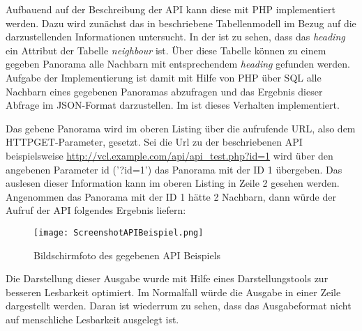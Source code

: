 
Aufbauend auf der Beschreibung der API kann diese mit PHP implementiert werden. Dazu wird zunächst das in  beschriebene Tabellenmodell im Bezug auf die darzustellenden Informationen untersucht. In der  ist zu sehen, dass das \textit{heading} ein Attribut der Tabelle \textit{neighbour} ist. Über diese Tabelle können zu einem gegeben Panorama alle Nachbarn mit entsprechendem \textit{heading} gefunden werden. Aufgabe der Implementierung ist damit mit Hilfe von PHP über SQL alle Nachbarn eines gegebenen Panoramas abzufragen und das Ergebnis dieser Abfrage im JSON-Format darzustellen. Im  ist dieses Verhalten implementiert.

\clearpage



Das gebene Panorama wird im oberen Listing über die aufrufende URL, also dem HTTP\footnotemark GET-Parameter, gesetzt. Sei die Url zu der beschriebenen API beispielsweise \url{http://vcl.example.com/api/api\_test.php?id=1} wird über den angebenen Parameter id ('?id=1') das Panorama mit der ID 1 übergeben. Das auslesen dieser Information kann im oberen Listing in Zeile 2 gesehen werden. Angenommen das Panorama mit der ID 1 hätte 2 Nachbarn, dann würde der Aufruf der API folgendes Ergebnis liefern:


\begin{figure}[htb]
\centering
\texttt{[image: ScreenshotAPIBeispiel.png]}
\caption[API Beispiel]{Bildschirmfoto des gegebenen API Beispiels}
\label{fig:ScreenshotAPIBeispiel}
\end{figure}

Die Darstellung dieser Ausgabe wurde mit Hilfe eines Darstellungstools zur besseren Lesbarkeit optimiert. Im Normalfall würde die Ausgabe in einer Zeile dargestellt werden. Daran ist wiederrum zu sehen, dass das Ausgabeformat nicht auf menschliche Lesbarkeit ausgelegt ist.

